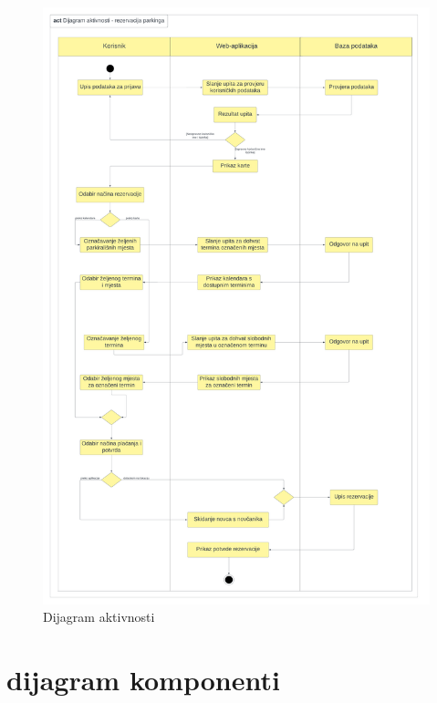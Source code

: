\begin{figure}[h!]
	\centering
	\includegraphics[width=1\linewidth]{dijagrami/DijagramAktivnosti.png}
	\caption{Dijagram aktivnosti}
	\label{fig:activitydiagram}
	\vfill
\end{figure}

\FloatBarrier

\section{dijagram komponenti}


\eject 